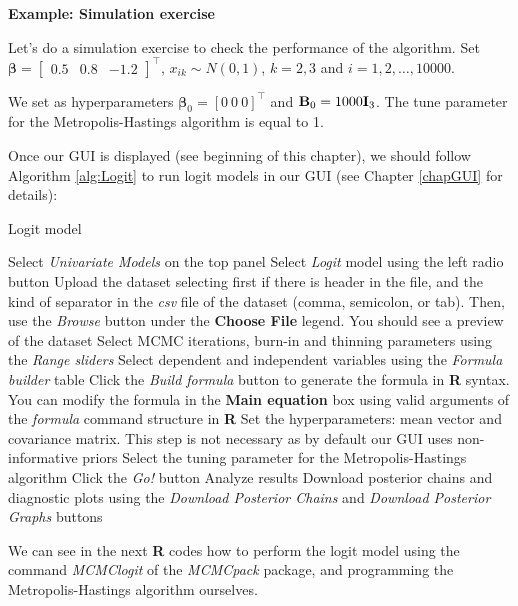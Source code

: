\textbf{Example: Simulation exercise}

Let's do a simulation exercise to check the performance of the algorithm. Set $\bm{\beta}=\begin{bmatrix}0.5 & 0.8 & -1.2\end{bmatrix}^{\top}$, $x_{ik}\sim N(0,1)$, $k=2,3$ and $i=1,2,\dots,10000$.

We set as hyperparameters $\bm{\beta}_0=[0 \ 0 \ 0]^{\top}$ and ${\bf{B}}_0=1000{\bf{I}}_3$. The tune parameter for the Metropolis-Hastings algorithm is equal to 1.

Once our GUI is displayed (see beginning of this chapter), we should follow Algorithm \ref{alg:Logit} to run logit models in our GUI (see Chapter \ref{chapGUI} for details):
\begin{algorithm}[h!]
	\caption{Logit model}\label{alg:Logit}
	\begin{algorithmic}[1]  		 			
		\State Select \textit{Univariate Models} on the top panel
		\State Select \textit{Logit} model using the left radio button
		\State Upload the dataset selecting first if there is header in the file, and the kind of separator in the \textit{csv} file of the dataset (comma, semicolon, or tab). Then, use the \textit{Browse} button under the \textbf{Choose File} legend. You should see a preview of the dataset
		\State Select MCMC iterations, burn-in and thinning parameters using the \textit{Range sliders}
		\State Select dependent and independent variables using the \textit{Formula builder} table
		\State Click the \textit{Build formula} button to generate the formula in \textbf{R} syntax. You can modify the formula in the \textbf{Main equation} box using valid arguments of the \textit{formula} command structure in \textbf{R}
		\State Set the hyperparameters: mean vector and covariance matrix. This step is not necessary as by default our GUI uses non-informative priors
		\State Select the tuning parameter for the Metropolis-Hastings algorithm
		\State Click the \textit{Go!} button
		\State Analyze results
		\State Download posterior chains and diagnostic plots using the \textit{Download Posterior Chains} and \textit{Download Posterior Graphs} buttons
	\end{algorithmic} 
\end{algorithm}

We can see in the next \textbf{R} codes how to perform the logit model using the command \textit{MCMClogit} of the \textit{MCMCpack} package, and programming the Metropolis-Hastings algorithm ourselves. 


